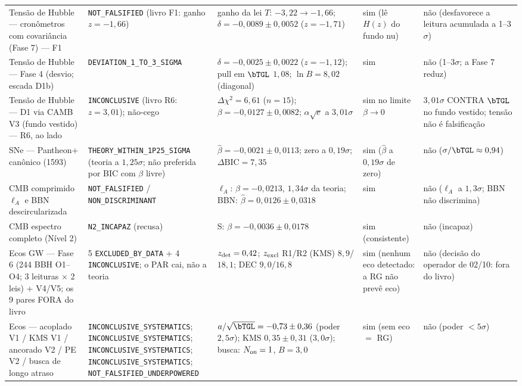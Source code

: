 \begin{footnotesize}
\begin{longtable}{@{}p{}p{}p{}p{}p{}@{}}
Tensão de Hubble --- cronômetros com covariância (Fase 7) --- F1 & \texttt{NOT\_\allowbreak{}FALSIFIED} (livro F1: ganho $z=-1{,}66$) & ganho da lei $T$: $-3{,}22\to-1{,}66$; $\delta=-0{,}0089\pm0{,}0052$ ($z=-1{,}71$) & sim (lê $H(z)$ do fundo nu) & não (desfavorece a leitura acumulada a 1--3$\sigma$) \\
Tensão de Hubble --- Fase 4 (desvio; escada D1b) & \texttt{DEVIATION\_\allowbreak{}1\_\allowbreak{}TO\_\allowbreak{}3\_\allowbreak{}SIGMA} & $\delta=-0{,}0025\pm0{,}0022$ ($z=-1{,}12$); pull em $\bTGL$ $1{,}08$; $\ln B=8{,}02$ (diagonal) & sim & não (1--3$\sigma$; a Fase 7 reduz) \\
Tensão de Hubble --- D1 via CAMB V3 (fundo vestido) --- R6, ao lado & \texttt{INCONCLUSIVE} (livro R6: $z=3{,}01$); não-cego & $\Delta\chi^2=6{,}61$ ($n=15$); $\beta=-0{,}0127\pm0{,}0082$; $\alpha\sqrt e$ a $3{,}01\sigma$ & sim no limite $\beta\to0$ & $3{,}01\sigma$ CONTRA $\bTGL$ no fundo vestido; tensão não é falsificação \\
SNe --- Pantheon+ canônico (1593) & \texttt{THEORY\_\allowbreak{}WITHIN\_\allowbreak{}1P25\_\allowbreak{}SIGMA} (teoria a $1{,}25\sigma$; não preferida por BIC com $\beta$ livre) & $\hat\beta=-0{,}0021\pm0{,}0113$; zero a $0{,}19\sigma$; $\Delta\mathrm{BIC}=7{,}35$ & sim ($\hat\beta$ a $0{,}19\sigma$ de zero) & não ($\sigma/\bTGL\approx0{,}94$) \\
CMB comprimido $\ell_A$ e BBN descircularizada & \texttt{NOT\_\allowbreak{}FALSIFIED} / \texttt{NON\_\allowbreak{}DISCRIMINANT} & $\ell_A$: $\beta=-0{,}0213$, $1{,}34\sigma$ da teoria; BBN: $\hat\beta=0{,}0126\pm0{,}0318$ & sim & não ($\ell_A$ a $1{,}3\sigma$; BBN não discrimina) \\
CMB espectro completo (Nível 2) & \texttt{N2\_\allowbreak{}INCAPAZ} (recusa) & S: $\beta=-0{,}0036\pm0{,}0178$ & sim (consistente) & não (incapaz) \\
Ecos GW --- Fase 6 (244 BBH O1--O4; 3 leituras $\times$ 2 leis) + V4/V5; os 9 pares FORA do livro & 5 \texttt{EXCLUDED\_BY\_DATA} + 4 \texttt{INCONCLUSIVE}; o PAR cai, não a teoria & $z_{\rm det}=0{,}42$; $z_{\rm excl}$ R1/R2 (KMS) $8{,}9$/$18{,}1$; DEC $9{,}0$/$16{,}8$ & sim (nenhum eco detectado: a RG não prevê eco) & não (decisão do operador de 02/10: fora do livro) \\
Ecos --- acoplado V1 / KMS V1 / ancorado V2 / PE V2 / busca de longo atraso & \texttt{INCONCLUSIVE\_\allowbreak{}SYSTEMATICS}; \texttt{INCONCLUSIVE\_\allowbreak{}SYSTEMATICS}; \texttt{INCONCLUSIVE\_\allowbreak{}SYSTEMATICS}; \texttt{INCONCLUSIVE\_\allowbreak{}SYSTEMATICS}; \texttt{NOT\_\allowbreak{}FALSIFIED\_\allowbreak{}UNDERPOWERED} & $a/\sqrt{\bTGL}=-0{,}73\pm0{,}36$ (poder $2{,}5\sigma$); KMS $0{,}35\pm0{,}31$ ($3{,}0\sigma$); busca: $N_{\rm on}=1$, $B=3{,}0$ & sim (sem eco $=$ RG) & não (poder $<5\sigma$) \\

\end{longtable}
\end{footnotesize}
